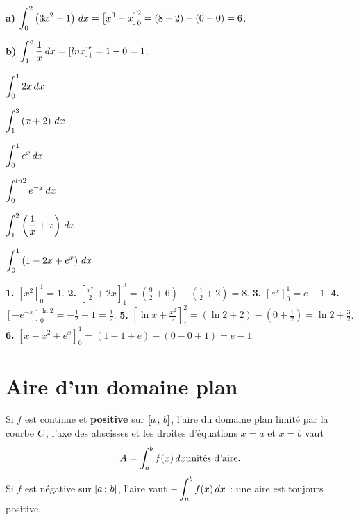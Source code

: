 \begin{exemple}
\textbf{a)} $\displaystyle\int_{0}^{2}\left(3x^{2}-1\right)\,dx
= \left[x^{3}-x\right]_{0}^{2} = (8-2)-(0-0) = 6$.

\textbf{b)} $\displaystyle\int_{1}^{e}\frac1x\,dx
= \left[ln x\right]_{1}^{e} = 1-0 = 1$.
\end{exemple}

\begin{entrainement}
\exo[\niveau{1}] $\displaystyle\int_{0}^{1} 2x\,dx$

\exo[\niveau{1}] $\displaystyle\int_{1}^{3}\left(x+2\right)\,dx$

\exo[\niveau{2}] $\displaystyle\int_{0}^{1} e^{x}\,dx$

\exo[\niveau{2}] $\displaystyle\int_{0}^{ln 2} e^{-x}\,dx$

\exo[\niveau{2}] $\displaystyle\int_{1}^{2}\left(\frac1x+x\right)\,dx$

\exo[\niveau{3}] $\displaystyle\int_{0}^{1}\left(1-2x+e^{x}\right)\,dx$
\end{entrainement}

\begin{corrige}
\textbf{1.} $\left[x^{2}\right]_{0}^{1} = 1$.
\textbf{2.} $\left[\frac{x^{2}}{2}+2x\right]_{1}^{3}
= \left(\frac92+6\right)-\left(\frac12+2\right) = 8$.
\textbf{3.} $\left[e^{x}\right]_{0}^{1} = e-1$.
\textbf{4.} $\left[-e^{-x}\right]_{0}^{\ln2} = -\frac12+1 = \frac12$.
\textbf{5.} $\left[\ln x+\frac{x^{2}}{2}\right]_{1}^{2}
= \left(\ln2+2\right)-\left(0+\frac12\right) = \ln2+\frac32$.
\textbf{6.} $\left[x-x^{2}+e^{x}\right]_{0}^{1} = (1-1+e)-(0-0+1) = e-1$.
\end{corrige}

\section{Aire d'un domaine plan}

\begin{theoreme}
Si $f$ est continue et \textbf{positive} sur $\left[a\,;\,b\right]$, l'aire du
domaine plan limité par la courbe $C$, l'axe des abscisses et les droites
d'équations $x = a$ et $x = b$ vaut
\[
  A = \int_{a}^{b} f(x)\,dx  \text{unités d'aire}.
\]
Si $f$ est négative sur $\left[a\,;\,b\right]$, l'aire vaut
$-\displaystyle\int_{a}^{b} f(x)\,dx$ : une aire est toujours positive.
\end{theoreme}


